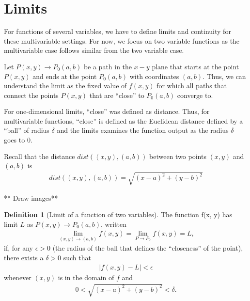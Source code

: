 \documentclass[
]{book}
\theoremstyle{definition}
\newtheorem{definition}{Definition}[chapter]
\theoremstyle{definition}
\theoremstyle{definition}
\theoremstyle{remark}
\begin{document}
\hypertarget{limits}{%
\section{Limits}\label{limits}}

For functions of several variables, we have to define limits and continuity for these multivariable settings. For now, we focus on two variable functions as the multivariable case follows similar from the two variable case.

Let \(P(x, y) \rightarrow P_0(a, b)\) be a path in the \(x-y\) plane that starts at the point \(P(x, y)\) and ends at the point \(P_0(a, b)\) with coordinates \((a, b)\). Thus, we can understand the limit as the fixed value of \(f(x, y)\) for which all paths that connect the points \(P(x, y)\) that are ``close'' to \(P_0(a, b)\) converge to.

For one-dimensional limits, ``close'' was defined as distance. Thus, for multivariable functions, ``close'' is defined as the Euclidean distance defined by a ``ball'' of radius \(\delta\) and the limits examines the function output as the radius \(\delta\) goes to 0.

Recall that the distance \(dist((x, y), (a, b))\) between two points \((x, y)\) and \((a, b)\) is
\[
\begin{aligned}
dist((x, y), (a, b)) = \sqrt{(x-a)^2 + (y-b)^2}
\end{aligned}
\]

** Draw images**

\begin{definition}[Limit of a function of two variables]
\protect\hypertarget{def:unnamed-chunk-272}{}{\label{def:unnamed-chunk-272} {} }The function f(x, y) has limit \(L\) as \(P(x, y) \rightarrow P_0(a, b)\), written
\[
\begin{aligned}
\lim_{(x, y) \rightarrow (a, b)} f(x, y) = \lim_{P \rightarrow P_0} f(x, y) = L,
\end{aligned}
\]
if, for any \(\epsilon > 0\) (the radius of the ball that defines the ``closeness'' of the point), there exists a \(\delta > 0\) such that
\[
\begin{aligned}
|f(x, y) - L| < \epsilon
\end{aligned}
\]
whenever \((x, y)\) is in the domain of \(f\) and
\[
\begin{aligned}
0 < \sqrt{(x-a)^2 + (y-b)^2} < \delta.
\end{aligned}
\]
\end{definition}
\end{document}
